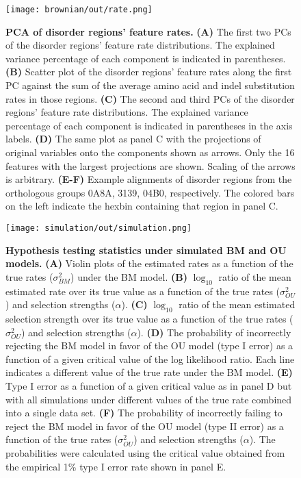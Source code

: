 \begin{figure}[h!]
\texttt{[image: brownian/out/rate.png]}
\centering
\caption{\textbf{PCA of disorder regions' feature rates.}
\textbf{(A)} The first two PCs of the disorder regions' feature rate distributions. The explained variance percentage of each component is indicated in parentheses. \textbf{(B)} Scatter plot of the disorder regions' feature rates along the first PC against the sum of the average amino acid and indel substitution rates in those regions. \textbf{(C)} The second and third PCs of the disorder regions' feature rate distributions. The explained variance percentage of each component is indicated in parentheses in the axis labels. \textbf{(D)} The same plot as panel C with the projections of original variables onto the components shown as arrows. Only the 16 features with the largest projections are shown. Scaling of the arrows is arbitrary. \textbf{(E-F)} Example alignments of disorder regions from the orthologous groups 0A8A, 3139, 04B0, respectively. The colored bars on the left indicate the hexbin containing that region in panel C.}
\label{fig:rate}
\end{figure}

\begin{figure}[h!]
\texttt{[image: simulation/out/simulation.png]}
\centering
\caption{\textbf{Hypothesis testing statistics under simulated BM and OU models.}
\textbf{(A)} Violin plots of the estimated rates as a function of the true rates ($\sigma^2_{BM}$) under the BM model. \textbf{(B)} $\log_{10}$ ratio of the mean estimated rate over its true value as a function of the true rates ($\sigma^2_{OU}$) and selection strengths ($\alpha$). \textbf{(C)} $\log_{10}$ ratio of the mean estimated selection strength over its true value as a function of the true rates ($\sigma^2_{OU}$) and selection strengths ($\alpha$). \textbf{(D)} The probability of incorrectly rejecting the BM model in favor of the OU model (type I error) as a function of a given critical value of the log likelihood ratio. Each line indicates a different value of the true rate under the BM model. \textbf{(E)} Type I error as a function of a given critical value as in panel D but with all simulations under different values of the true rate combined into a single data set. \textbf{(F)} The probability of incorrectly failing to reject the BM model in favor of the OU model (type II error) as a function of the true rates ($\sigma^2_{OU}$) and selection strengths ($\alpha$). The probabilities were calculated using the critical value obtained from the empirical 1\% type I error rate shown in panel E.}
\label{fig:simulation}
\end{figure}

